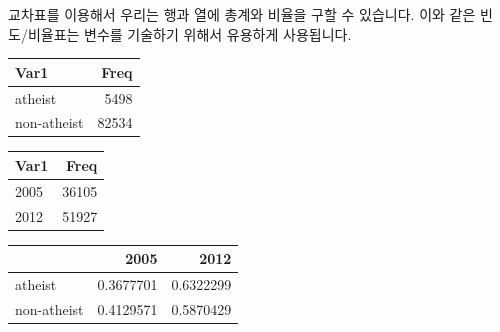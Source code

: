 \documentclass[]{book}
\newenvironment{Shaded}{\begin{snugshade}}{\end{snugshade}}
\newcommand{\CommentTok}[1]{\textcolor[rgb]{0.56,0.35,0.01}{\textit{#1}}}
\newcommand{\DecValTok}[1]{\textcolor[rgb]{0.00,0.00,0.81}{#1}}
\newcommand{\KeywordTok}[1]{\textcolor[rgb]{0.13,0.29,0.53}{\textbf{#1}}}
\newcommand{\NormalTok}[1]{#1}
\newcommand{\OperatorTok}[1]{\textcolor[rgb]{0.81,0.36,0.00}{\textbf{#1}}}
\newcommand{\StringTok}[1]{\textcolor[rgb]{0.31,0.60,0.02}{#1}}
\begin{document}
교차표를 이용해서 우리는 행과 열에 총계와 비율을 구할 수 있습니다. 이와 같은 빈도/비율표는 변수를 기술하기 위해서 유용하게 사용됩니다.

\begin{Shaded}
\end{Shaded}

\begin{tabular}{l|r}
\hline
Var1 & Freq\\
\hline
atheist & 5498\\
\hline
non-atheist & 82534\\
\hline
\end{tabular}

\begin{Shaded}
\end{Shaded}

\begin{tabular}{l|r}
\hline
Var1 & Freq\\
\hline
2005 & 36105\\
\hline
2012 & 51927\\
\hline
\end{tabular}

\begin{Shaded}
\end{Shaded}

\begin{tabular}{l|r|r}
\hline
  & 2005 & 2012\\
\hline
atheist & 0.3677701 & 0.6322299\\
\hline
non-atheist & 0.4129571 & 0.5870429\\
\hline
\end{tabular}
\end{document}
